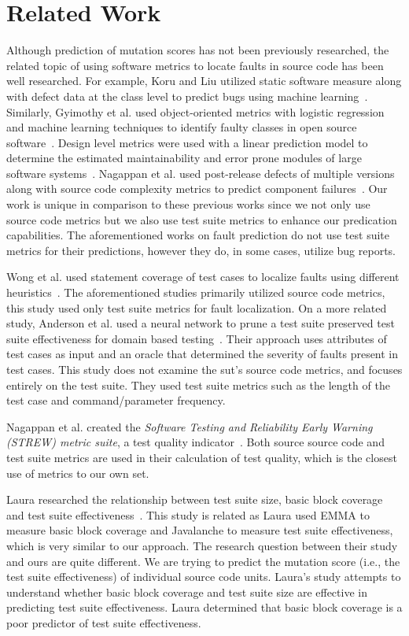 \section{Related Work}
\label{sec:approach_related_work}
Although prediction of mutation scores has not been previously researched, the related topic of using software metrics to locate faults in source code has been well researched. For example, Koru and Liu utilized static software measure along with defect data at the class level to predict bugs using machine learning~\cite{KL05}. Similarly, Gyimothy et al. used object-oriented metrics with logistic regression and machine learning techniques to identify faulty classes in open source software~\cite{GFS05}. Design level metrics were used with a linear prediction model to determine the estimated maintainability and error prone modules of large software systems~\cite{MKPS00}. Nagappan et al. used post-release defects of multiple versions along with source code complexity metrics to predict component failures~\cite{NBZ06}. Our work is unique in comparison to these previous works since we not only use source code metrics but we also use test suite metrics to enhance our predication capabilities. The aforementioned works on fault prediction do not use test suite metrics for their predictions, however they do, in some cases, utilize bug reports.

Wong et al. used statement coverage of test cases to localize faults using different heuristics~\cite{WDC10}. The aforementioned studies primarily utilized source code metrics, this study used only test suite metrics for fault localization. On a more related study, Anderson et al. used a neural network to prune a test suite preserved test suite effectiveness for domain based testing~\cite{AMM95}. Their approach uses attributes of test cases as input and an oracle that determined the severity of faults present in test cases. This study does not examine the \gls{sut}'s source code metrics, and focuses entirely on the test suite. They used test suite metrics such as the length of the test case and command/parameter frequency.

Nagappan et al. created the \emph{Software Testing and Reliability Early Warning (STREW) metric suite}, a test quality indicator~\cite{NWO+05, NWVO05}. Both source source code and test suite metrics are used in their calculation of test quality, which is the closest use of metrics to our own set.

Laura researched the relationship between test suite size, basic block coverage and test suite effectiveness~\cite{Ino12}. This study is related as Laura used EMMA to measure basic block coverage and Javalanche to measure test suite effectiveness, which is very similar to our approach. The research question between their study and ours are quite different. We are trying to predict the mutation score (i.e., the test suite effectiveness) of individual source code units. Laura's study attempts to understand whether basic block coverage and test suite size are effective in predicting test suite effectiveness. Laura determined that basic block coverage is a poor predictor of test suite effectiveness. 


